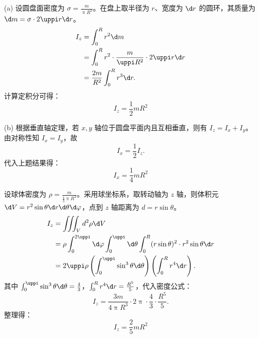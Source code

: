 \begin{solution}

    (a) 设圆盘面密度为 $\sigma = \frac{m}{\uppi R^2}$。在盘上取半径为 $r$、宽度为 $\d r$ 的圆环，其质量为 $\d m = \sigma \cdot 2\uppi r \d r$。
    \begin{equation}
        \label{eq:inertia-disk-z}
        \begin{aligned}
            I_z & = \int_0^R r^2 \d m                                          \\
                & = \int_0^R r^2 \cdot \frac{m}{\uppi R^2} \cdot 2\uppi r \d r \\
                & = \frac{2m}{R^2} \int_0^R r^3 \d r.
        \end{aligned}
    \end{equation}
    计算定积分可得：
    \begin{equation}
        I_z = \boxed{ \frac{1}{2} mR^2 }
    \end{equation}

    (b) 根据垂直轴定理，若 $x, y$ 轴位于圆盘平面内且互相垂直，则有 $I_z = I_x + I_y$。由对称性知 $I_x = I_y$，故
    \begin{equation}
        \label{eq:inertia-disk-x}
        I_x = \frac{1}{2} I_z.
    \end{equation}
    代入上题结果得：
    \begin{equation}
        I_x = \boxed{ \frac{1}{4} mR^2 }
    \end{equation}


    设球体密度为 $\rho = \frac{m}{\frac{4}{3}\uppi R^3}$。采用球坐标系，取转动轴为 $z$ 轴，则体积元 $\d V = r^2 \sin \theta \d r \d \theta \d \varphi$，点到 $z$ 轴距离为 $d = r \sin \theta$。
    \begin{equation}
        \label{eq:inertia-sphere}
        \begin{aligned}
            I_z & = \iiint_V d^2 \rho \d V                                                                                         \\
                & = \rho \int_0^{2\uppi} \d \varphi \int_0^{\uppi} \d \theta \int_0^R (r \sin \theta)^2 \cdot r^2 \sin \theta \d r \\
                & = 2\uppi \rho \left( \int_0^{\uppi} \sin^3 \theta \d \theta \right) \left( \int_0^R r^4 \d r \right).
        \end{aligned}
    \end{equation}
    其中 $\int_0^{\uppi} \sin^3 \theta \d \theta = \frac{4}{3}$，$\int_0^R r^4 \d r = \frac{R^5}{5}$，代入密度公式：
    \begin{equation}
        I_z = \frac{3m}{4\uppi R^3} \cdot 2\uppi \cdot \frac{4}{3} \cdot \frac{R^5}{5}.
    \end{equation}
    整理得：
    \begin{equation}
        I_z = \boxed{ \frac{2}{5} mR^2 }
    \end{equation}
\end{solution}

